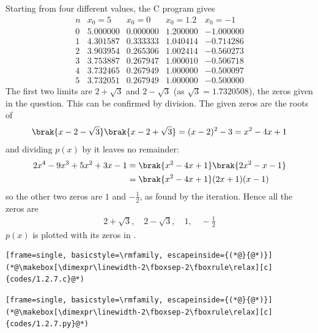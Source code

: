 \begin{enumerate}[label=\thesubsection.\arabic*, ref=\thesubsection.\theenumi]
Starting from four different values, the C program gives
\[
\begin{array}{c|r|r|r|r}
n & x_0 = 5 & x_0 = 0 & x_0 = 1.2 & x_0 = -1 \\\hline
0 & 5.000000 & 0.000000 & 1.200000 & -1.000000 \\
1 & 4.301587 & 0.333333 & 1.040414 & -0.714286 \\
2 & 3.903954 & 0.265306 & 1.002414 & -0.560273 \\
3 & 3.753887 & 0.267947 & 1.000010 & -0.506718 \\
4 & 3.732465 & 0.267949 & 1.000000 & -0.500097 \\
5 & 3.732051 & 0.267949 & 1.000000 & -0.500000
\end{array}
\]
The first two limits are $2 + \sqrt{3}$ and $2 - \sqrt{3}$ (as $\sqrt{3} = 1.7320508$), the zeros given in the question. This can be confirmed by division. The given zeros are the roots of
\begin{align*}
\brak{x - 2 - \sqrt{3}}\brak{x - 2 + \sqrt{3}} = (x-2)^2 - 3 = x^2 - 4x + 1
\end{align*}
and dividing $p(x)$ by it leaves no remainder:
\begin{align*}
2x^4 - 9x^3 + 5x^2 + 3x - 1 &= \brak{x^2 - 4x + 1}\brak{2x^2 - x - 1} \\
&= \brak{x^2 - 4x + 1}(2x + 1)(x - 1)
\end{align*}
so the other two zeros are $1$ and $-\frac{1}{2}$, as found by the iteration. Hence all the zeros are
\begin{align}
\boxed{2 + \sqrt{3}, \quad 2 - \sqrt{3}, \quad 1, \quad -\frac{1}{2}}
\end{align}
$p(x)$ is plotted with its zeros in .
\begin{lstlisting}[frame=single, basicstyle=\rmfamily, escapeinside={(*@}{@*)}]
(*@\makebox[\dimexpr\linewidth-2\fboxsep-2\fboxrule\relax][c]{codes/1.2.7.c}@*)
\end{lstlisting}
\begin{lstlisting}[frame=single, basicstyle=\rmfamily, escapeinside={(*@}{@*)}]
(*@\makebox[\dimexpr\linewidth-2\fboxsep-2\fboxrule\relax][c]{codes/1.2.7.py}@*)
\end{lstlisting}
\begin{figure}[H]

\end{figure}
\end{enumerate}

